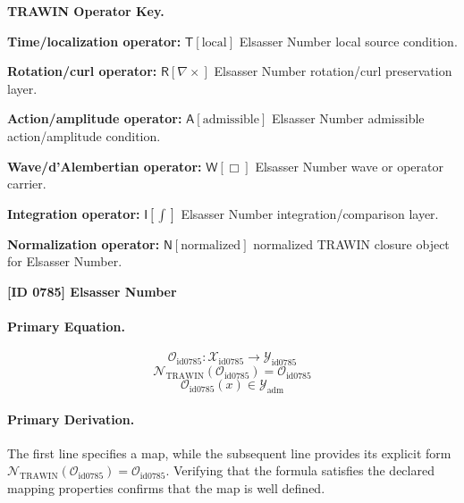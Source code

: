 \par\vspace{0.45\baselineskip}
\noindent\begin{minipage}[t]{\linewidth}
\begingroup
\small
\raggedright
\textbf{TRAWIN Operator Key.}\par
\noindent\textbf{Time/localization operator:} $\mathsf{T}\!\left[\mathrm{local}\right]$ Elsasser Number local source condition.\par
\noindent\textbf{Rotation/curl operator:} $\mathsf{R}\!\left[\nabla\times\right]$ Elsasser Number rotation/curl preservation layer.\par
\noindent\textbf{Action/amplitude operator:} $\mathsf{A}\!\left[\mathrm{admissible}\right]$ Elsasser Number admissible action/amplitude condition.\par
\noindent\textbf{Wave/d'Alembertian operator:} $\mathsf{W}\!\left[\Box\right]$ Elsasser Number wave or operator carrier.\par
\noindent\textbf{Integration operator:} $\mathsf{I}\!\left[\int\right]$ Elsasser Number integration/comparison layer.\par
\noindent\textbf{Normalization operator:} $\mathsf{N}\!\left[\mathrm{normalized}\right]$ normalized TRAWIN closure object for Elsasser Number.\par
\endgroup
\end{minipage}

\clearpage
\noindent\textbf{[ID 0785] Elsasser Number}\par
\vspace{0.35em}
\paragraph{Primary Equation.}
\[
\mathcal{O}_{\mathrm{id0785}}:\mathcal{X}_{\mathrm{id0785}}\longrightarrow\mathcal{Y}_{\mathrm{id0785}}
\]
\[
\mathcal{N}_{\mathrm{TRAWIN}}(\mathcal{O}_{\mathrm{id0785}})=\mathcal{O}_{\mathrm{id0785}}
\]
\[
\mathcal{O}_{\mathrm{id0785}}(x)\in\mathcal{Y}_{\mathrm{adm}}
\]

\paragraph{Primary Derivation.}
The first line specifies a map, while the subsequent line provides its explicit form \( \mathcal{N}_{\mathrm{TRAWIN}}(\mathcal{O}_{\mathrm{id0785}})=\mathcal{O}_{\mathrm{id0785}} \). Verifying that the formula satisfies the declared mapping properties confirms that the map is well defined.

